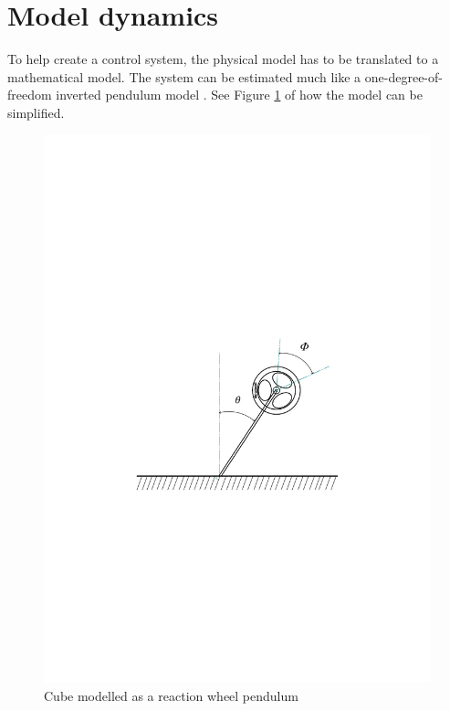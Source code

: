 \documentclass[a4paper,11pt]{kth-mag}
\begin{document}
\section{Model dynamics} \label{section: model dynamics}
To help create a control system, the physical model has to be translated to a mathematical model. The system can be estimated much like a one-degree-of-freedom inverted pendulum model \cite{KTHpendulum}. See Figure \ref{fig:Lagrangeflywheel} of how the model can be simplified.
\begin{figure}[!htb]
\centering
\includegraphics[trim=5cm 9cm 5cm 9cm, clip=true,scale=.6]{Lagrangeflywheel2.pdf}
\caption{Cube modelled as a reaction wheel pendulum }
\label{fig:Lagrangeflywheel}
\end{figure}
\end{document}
